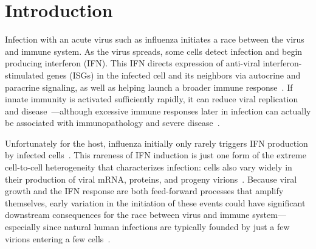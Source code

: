 \documentclass[lineno]{asm-article}
\begin{document}
\section{Introduction}
Infection with an acute virus such as influenza initiates a race between the virus and immune system.
As the virus spreads, some cells detect infection and begin producing interferon (IFN).
This IFN directs expression of anti-viral interferon-stimulated genes (ISGs) in the infected cell and its neighbors via autocrine and paracrine signaling, as well as helping launch a broader immune response~\cite{stetson2006type,honda2006type}.
If innate immunity is activated sufficiently rapidly, it can reduce viral replication and disease~\cite{solov1969results,treanor1987intranasally,beilharz2007protection,kugel2009intranasal,steel2010transmission}---although excessive immune responses later in infection can actually be associated with immunopathology and severe disease~\cite{la2007question, iwasaki2014innate}.

Unfortunately for the host, influenza initially only rarely triggers IFN production by infected cells~\cite{kallfass2013visualizing, killip2017single}.
This rareness of IFN induction is just one form of the extreme cell-to-cell heterogeneity that characterizes infection: cells also vary widely in their production of viral mRNA, proteins, and progeny virions~\cite{russell2018extreme,steuerman2018dissection,sjaastad2018distinct,heldt2015single,wang2018cell}.
Because viral growth and the IFN response are both feed-forward processes that amplify themselves, early variation in the initiation of these events could have significant downstream consequences for the race between virus and immune system---especially since natural human infections are typically founded by just a few virions entering a few cells~\cite{mccrone2018stochastic, xue2018reconciling, varble2014influenza}.
\end{document}
